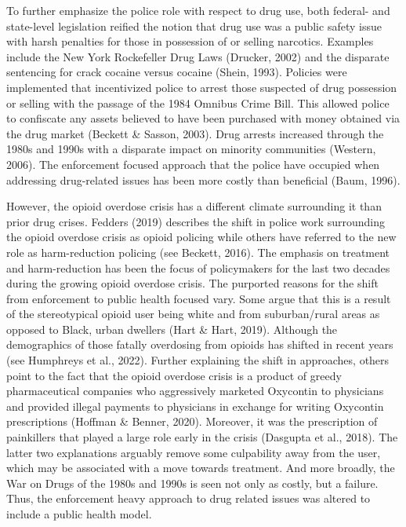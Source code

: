 To further emphasize the police role with respect to drug use, both federal- and state-level legislation reified the notion that drug use was a public safety issue with harsh penalties for those in possession of or selling narcotics. Examples include the New York Rockefeller Drug Laws (Drucker, 2002) and the disparate sentencing for crack cocaine versus cocaine (Shein, 1993). Policies were implemented that incentivized police to arrest those suspected of drug possession or selling with the passage of the 1984 Omnibus Crime Bill. This allowed police to confiscate any assets believed to have been purchased with money obtained via the drug market (Beckett & Sasson, 2003). Drug arrests increased through the 1980s and 1990s with a disparate impact on minority communities (Western, 2006). The enforcement focused approach that the police have occupied when addressing drug-related issues has been more costly than beneficial (Baum, 1996). 

However, the opioid overdose crisis has a different climate surrounding it than prior drug crises. Fedders (2019) describes the shift in police work surrounding the opioid overdose crisis as opioid policing while others have referred to the new role as harm-reduction policing (see Beckett, 2016). The emphasis on treatment and harm-reduction has been the focus of policymakers for the last two decades during the growing opioid overdose crisis. The purported reasons for the shift from enforcement to public health focused vary. Some argue that this is a result of the stereotypical opioid user being white and from suburban/rural areas as opposed to Black, urban dwellers (Hart & Hart, 2019). Although the demographics of those fatally overdosing from opioids has shifted in recent years (see Humphreys et al., 2022). Further explaining the shift in approaches, others point to the fact that the opioid overdose crisis is a product of greedy pharmaceutical companies who aggressively marketed Oxycontin to physicians and provided illegal payments to physicians in exchange for writing Oxycontin prescriptions (Hoffman & Benner, 2020). Moreover, it was the prescription of painkillers that played a large role early in the crisis (Dasgupta et al., 2018). The latter two explanations arguably remove some culpability away from the user, which may be associated with a move towards treatment. And more broadly, the War on Drugs of the 1980s and 1990s is seen not only as costly, but a failure. Thus, the enforcement heavy approach to drug related issues was altered to include a public health model. 

